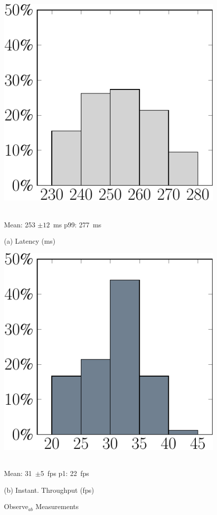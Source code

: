 \begin{figure}
\centering

\begin{minipage}[b]{.49\linewidth}
\centering
\includegraphics[width=0.8\linewidth]{chapter5/FIGS/histo-observeab-latency.pdf}
\begin{captext}
\centering
\\[0.1cm] Mean: 253 $\pm 12$~ms\; p99: 277~ms\\
\end{captext}
\vspace{-0.05in}
{\small (a) Latency (ms)}
\end{minipage}
\begin{minipage}[b]{.49\linewidth}
\centering
\includegraphics[width=0.8\linewidth]{chapter5/FIGS/histo-observeab-throughput.pdf}
\begin{captext}
\centering
\\[0.1cm] Mean: 31~$\pm$5~fps\; p1: 22~fps\\
\end{captext}
\vspace{-0.05in}
{\small (b) Instant. Throughput (fps)}
\end{minipage}
\caption{Observe$_{ab}$ Measurements}
\label{fig:d2c-drone-histo}
\vspace{-0.1in}
\end{figure}

